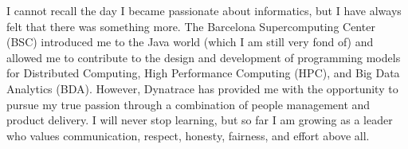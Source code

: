 %
%
%

\par{

I cannot recall the day I became passionate about informatics, but I have always felt that there was something more. The Barcelona Supercomputing Center (BSC) introduced me to the Java world (which I am still very fond of) and allowed me to contribute to the design and development of programming models for Distributed Computing, High Performance Computing (HPC), and Big Data Analytics (BDA). However, Dynatrace has provided me with the opportunity to pursue my true passion through a combination of people management and product delivery. I will never stop learning, but so far I am growing as a leader who values communication, respect, honesty, fairness, and effort above all. 

}

\vspace{1em}
